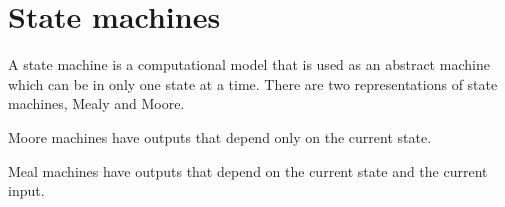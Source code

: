 \section{State machines}

A state machine is a computational model that is used as an
abstract machine which can be in only one state at a time.
There are two representations of state machines, Mealy and Moore.

Moore machines have outputs that depend only on the current state.

Meal machines have outputs that depend on the current state and the current input.


